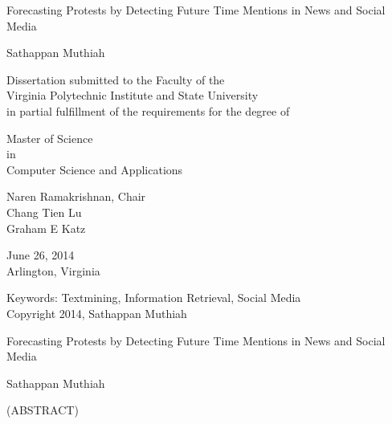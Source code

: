 \documentclass[12pt]{report}
\begin{document}
\thispagestyle{empty}

\newcommand{\then}{\Rightarrow}
\newcommand{\softor}{\operatornamewithlimits{\tilde{\vee}}}
\newcommand{\softand}{\operatornamewithlimits{\tilde{\wedge}}}
\newcommand{\softthen}{\operatornamewithlimits{\tilde{\then}}}
\newcommand{\softneg}{\operatornamewithlimits{\tilde{\neg}}}

\begin{center}

{\Large
    Forecasting Protests by Detecting Future Time Mentions in News and Social Media
}

\vfill

Sathappan Muthiah
\vfill

Dissertation submitted to the Faculty of the \\
Virginia Polytechnic Institute and State University \\
in partial fulfillment of the requirements for the degree of

\vfill

Master of Science\\
in \\
Computer Science and Applications

\vfill

Naren Ramakrishnan, Chair \\
Chang Tien Lu \\
Graham E Katz \\

\vfill

June 26, 2014 \\
Arlington, Virginia

\vfill

Keywords: Textmining, Information Retrieval, Social Media
\\
Copyright 2014, Sathappan Muthiah

\end{center}

\pagebreak

\thispagestyle{empty}
\begin{center}

{\large Forecasting Protests by Detecting Future Time Mentions in News and Social Media
}

\vfill

Sathappan Muthiah

\vfill

(ABSTRACT)

\vfill

\end{center}
\end{document}
